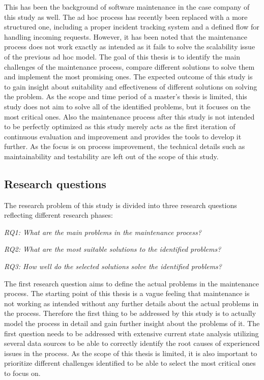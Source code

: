 This has been the background of software maintenance in the case company of this study as well. The ad hoc process has recently been replaced with a more structured one, including a proper incident tracking system
and a defined flow for handling incoming requests. However, it has been noted that the maintenance process does not work exactly as intended as it fails to solve the scalability issue of the previous ad hoc model.
The goal of this thesis is to identify the main challenges of the maintenance process, compare different solutions to solve them and implement the most promising ones. The expected outcome of this study
is to gain insight about suitability and effectiveness of different solutions on solving the problem. As the scope and time period of a master's thesis is limited, this study does not aim to solve all
of the identified problems, but it focuses on the most critical ones. Also the maintenance process after this study is not intended to be perfectly optimized as this study merely acts as the first iteration of continuous
evaluation and improvement and provides the tools to develop it further. As the focus is on process improvement, the technical details such as maintainability and testability are left out of the scope of this
study.

\subsection*{Research questions}

The research problem of this study is divided into three research questions reflecting different research phases:

\vspace{12pt}

\emph{RQ1: What are the main problems in the maintenance process?}

\vspace{12pt}

\emph{RQ2: What are the most suitable solutions to the identified problems?}

\vspace{12pt}

\emph{RQ3: How well do the selected solutions solve the identified problems?}

\vspace{12pt}

The first research question aims to define the actual problems in the maintenance process. The starting point of this thesis is a vague feeling that maintenance is not working as intended without
any further details about the actual problems in the process. Therefore the first thing to be addressed by this study is to actually model the process in detail and gain further insight about
the problems of it. The first question needs to be addressed with extensive current state analysis utilizing several data sources to be able to correctly identify the root causes of experienced
issues in the process. As the scope of this thesis is limited, it is also important to prioritize different challenges identified to be able to select the most critical ones to focus on.

